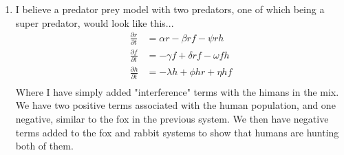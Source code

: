 \documentclass[11pt]{article}
\begin{document}
\begin{enumerate}
        \item I believe a predator prey model with two predators, one of which
            being a super predator, would look like this...
            \begin{align*}
                \frac{\partial r}{\partial t} &= \alpha r - \beta r f - \psi rh \\
                \frac{\partial f}{\partial t} &= -\gamma f + \delta rf - \omega fh \\
                \frac{\partial h}{\partial t} &= -\lambda h + \phi hr + \eta hf \\
            \end{align*}
            Where I have simply added "interference" terms with the himans in
            the mix. We have two positive terms associated with the human
            population, and one negative, similar to the fox in the previous
            system. We then have negative terms added to the fox and rabbit
            systems to show that humans are hunting both of them.

    \end{enumerate}
\end{document}
